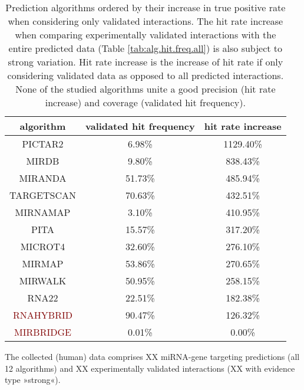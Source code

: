 \begin{table}
\centering
\begin{tabular}{c | c | c}
algorithm & validated hit frequency & hit rate increase\\ \hline
\hline
\textcolor{OliveGreen}{PICTAR2} & 6.98\% & 1129.40\%\\ \hline
\textcolor{OliveGreen}{MIRDB} & 9.80\% & 838.43\%\\ \hline
\textcolor{OliveGreen}{MIRANDA} & 51.73\% & 485.94\%\\ \hline
\textcolor{OliveGreen}{TARGETSCAN} & 70.63\% & 432.51\%\\ \hline
\textcolor{OliveGreen}{MIRNAMAP} & 3.10\% & 410.95\%\\ \hline
\textcolor{OliveGreen}{PITA} & 15.57\% & 317.20\%\\ \hline
\textcolor{OliveGreen}{MICROT4} & 32.60\% & 276.10\%\\ \hline
\textcolor{OliveGreen}{MIRMAP} & 53.86\% & 270.65\%\\ \hline
\textcolor{OliveGreen}{MIRWALK} & 50.95\% & 258.15\%\\ \hline
\textcolor{OliveGreen}{RNA22} & 22.51\% & 182.38\%\\ \hline
\textcolor{Maroon}{RNAHYBRID} & 90.47\% & 126.32\%\\ \hline
\textcolor{Maroon}{MIRBRIDGE} & 0.01\% & 0.00\%\\ \hline
\end{tabular}
\caption{Prediction algorithms ordered by their increase in true positive rate when considering only validated interactions. The hit rate increase when comparing experimentally validated interactions with the entire predicted data (Table \ref{tab:alg.hit.freq.all}) is also subject to strong variation. Hit rate increase is the increase of hit rate if only considering validated data as opposed to all predicted interactions. None of the studied algorithms unite a good precision (hit rate increase) and coverage (validated hit frequency).}
\label{tab:alg.hit.freq.val}
\end{table}


The collected (human) data comprises XX miRNA-gene targeting predictions (all 12 algorithms) and XX experimentally validated interactions (XX with evidence type »strong«).

